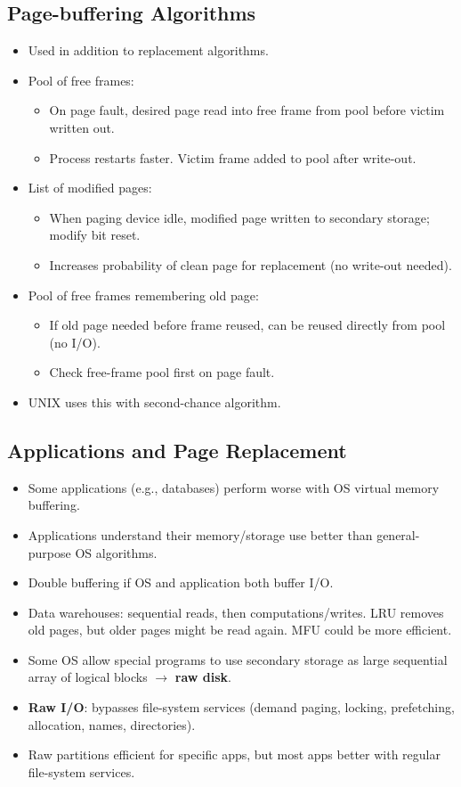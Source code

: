 \subsection{Page-buffering Algorithms}
\begin{itemize}
    \item Used in addition to replacement algorithms.
    \item Pool of free frames:
    \begin{itemize}
        \item On page fault, desired page read into free frame from pool before victim written out.
        \item Process restarts faster. Victim frame added to pool after write-out.
    \end{itemize}
    \item List of modified pages:
    \begin{itemize}
        \item When paging device idle, modified page written to secondary storage; modify bit reset.
        \item Increases probability of clean page for replacement (no write-out needed).
    \end{itemize}
    \item Pool of free frames remembering old page:
    \begin{itemize}
        \item If old page needed before frame reused, can be reused directly from pool (no I/O).
        \item Check free-frame pool first on page fault.
    \end{itemize}
    \item UNIX uses this with second-chance algorithm.
\end{itemize}

\subsection{Applications and Page Replacement}
\begin{itemize}
    \item Some applications (e.g., databases) perform worse with OS virtual memory buffering.
    \item Applications understand their memory/storage use better than general-purpose OS algorithms.
    \item Double buffering if OS and application both buffer I/O.
    \item Data warehouses: sequential reads, then computations/writes. LRU removes old pages, but older pages might be read again. MFU could be more efficient.
    \item Some OS allow special programs to use secondary storage as large sequential array of logical blocks $\rightarrow$ \textbf{raw disk}.
    \item \textbf{Raw I/O}: bypasses file-system services (demand paging, locking, prefetching, allocation, names, directories).
    \item Raw partitions efficient for specific apps, but most apps better with regular file-system services.
\end{itemize}

